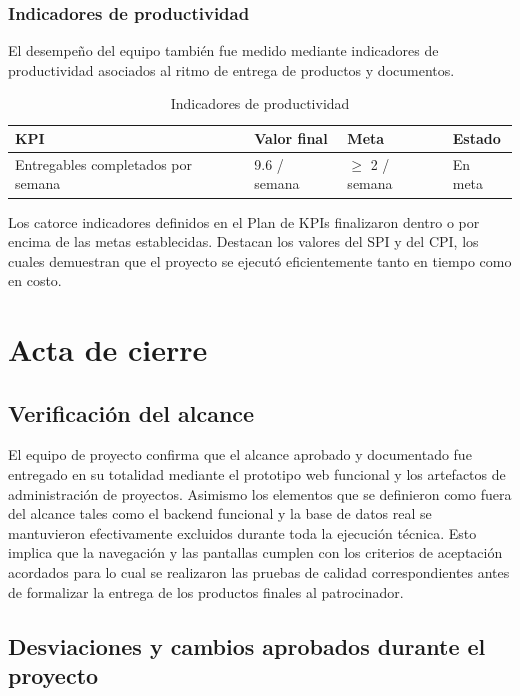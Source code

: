 \documentclass[11pt,spanish]{article}
\begin{document}
\subsubsection{Indicadores de productividad}

El desempeño del equipo también fue medido mediante indicadores de
productividad asociados al ritmo de entrega de productos y documentos.

\begin{table}[H]
\centering
\caption{Indicadores de productividad}
\label{tab:kpi-productividad}
\begin{tabularx}{\textwidth}{Yp{3cm}p{2.5cm}p{2.5cm}}
\toprule
\textbf{KPI} &
\textbf{Valor final} &
\textbf{Meta} &
\textbf{Estado} \\
\midrule

Entregables completados por semana &
9.6 / semana &
$\geq$ 2 / semana &
En meta
\\

\bottomrule
\end{tabularx}
\end{table}

Los catorce indicadores definidos en el Plan de KPIs finalizaron dentro o por
encima de las metas establecidas. Destacan los valores del SPI y del CPI,
los cuales demuestran que el proyecto se ejecutó eficientemente tanto en
tiempo como en costo.

\section{Acta de cierre}

\subsection{Verificación del alcance}

El equipo de proyecto confirma que el alcance aprobado y documentado fue entregado en su totalidad mediante el prototipo web funcional y los artefactos de administración de proyectos. Asimismo los elementos que se definieron como fuera del alcance tales como el backend funcional y la base de datos real se mantuvieron efectivamente excluidos durante toda la ejecución técnica. Esto implica que la navegación y las pantallas cumplen con los criterios de aceptación acordados para lo cual se realizaron las pruebas de calidad correspondientes antes de formalizar la entrega de los productos finales al patrocinador.

\subsection{Desviaciones y cambios aprobados durante el proyecto}
\end{document}
